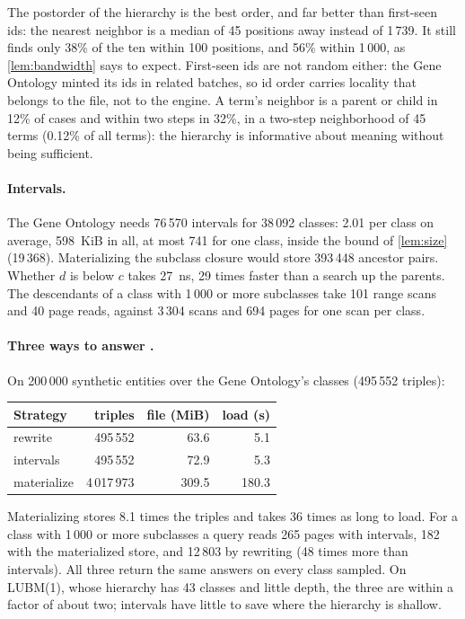 The postorder of the hierarchy is the best order, and far better than first-seen
ids: the nearest neighbor is a median of 45 positions away instead of 1\,739. It
still finds only 38\% of the ten within 100 positions, and 56\% within 1\,000, as
\cref{lem:bandwidth} says to expect. First-seen ids are not random either: the
Gene Ontology minted its ids in related batches, so id order carries locality that
belongs to the file, not to the engine. A term's neighbor is a parent or child in
12\% of cases and within two  steps in 32\%, in a two-step
neighborhood of 45 terms (0.12\% of all terms): the hierarchy is informative about
meaning without being sufficient.

\paragraph{Intervals.} The Gene Ontology needs 76\,570 intervals for 38\,092
classes: 2.01 per class on average, 598~KiB in all, at most 741 for one class,
inside the bound of \cref{lem:size} (19\,368). Materializing the subclass closure
would store 393\,448 ancestor pairs. Whether $d$ is below $c$ takes 27~ns, 29 times
faster than a search up the parents. The descendants of a class with 1\,000 or more
subclasses take 101 range scans and 40 page reads, against 3\,304 scans and 694
pages for one scan per class.

\paragraph{Three ways to answer .} On 200\,000 synthetic entities over
the Gene Ontology's classes (495\,552 triples):

\begin{center}
\small
\begin{tabular}{@{}lrrr@{}}
\toprule
Strategy & triples & file (MiB) & load (s) \\
\midrule
rewrite & 495\,552 & 63.6 & 5.1 \\
intervals & 495\,552 & 72.9 & 5.3 \\
materialize & 4\,017\,973 & 309.5 & 180.3 \\
\bottomrule
\end{tabular}
\end{center}

Materializing stores 8.1 times the triples and takes 36 times as long to load. For
a class with 1\,000 or more subclasses a query reads 265 pages with intervals, 182
with the materialized store, and 12\,803 by rewriting (48 times more than
intervals). All three return the same answers on every class sampled. On LUBM(1),
whose hierarchy has 43 classes and little depth, the three are within a factor of
about two; intervals have little to save where the hierarchy is shallow.

